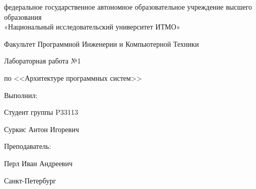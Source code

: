 \begin{titlepage}
    \begin{center}
        федеральное государственное автономное образовательное учреждение высшего образования\\
        «Национальный исследовательский университет ИТМО»

        \bigskip

        Факультет Программной Инженерии и Компьютерной Техники

        \vfill

        {\Large
        Лабораторная работа №1

        по <<Архитектуре программных систем>>

%
        }
    \end{center}

    \bigskip

    \begin{flushright}
        Выполнил:

        Студент группы P33113

        Суркис Антон Игоревич

        Преподаватель:

        Перл Иван Андреевич
    \end{flushright}

    \vfill

    \begin{center}
        Санкт-Петербург

        \the\year
    \end{center}


\end{titlepage}
